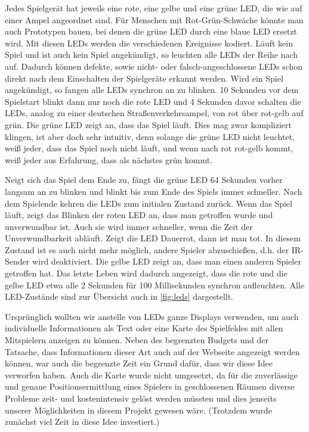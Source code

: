 Jedes Spielgerät hat jeweils eine rote, eine gelbe und eine grüne LED, die wie auf einer Ampel
angeordnet sind.
Für Menschen mit Rot-Grün-Schwäche könnte man auch Prototypen bauen, bei denen die grüne LED durch
eine blaue LED ersetzt wird.
Mit diesen LEDs werden die verschiedenen Ereignisse kodiert.
Läuft kein Spiel und ist auch kein Spiel angekündigt, so leuchten alle LEDs der Reihe nach auf.
Dadurch können defekte, sowie nicht- oder falsch-angeschlossene LEDs schon direkt nach dem
Einschalten der Spielgeräte erkannt werden.
Wird ein Spiel angekündigt, so fangen alle LEDs synchron an zu blinken.
10 Sekunden vor dem Spielstart blinkt dann nur noch die rote LED und 4 Sekunden davor schalten die
LEDs, analog zu einer deutschen Straßenverkehrsampel, von rot über rot-gelb auf grün.
Die grüne LED zeigt an, dass das Spiel läuft.
Dies mag zwar kompliziert klingen, ist aber doch sehr intuitiv, denn solange die grüne LED nicht
leuchtet, weiß jeder, dass das Spiel noch nicht läuft, und wenn nach rot rot-gelb kommt, weiß jeder
aus Erfahrung, dass als nächstes grün kommt.

Neigt sich das Spiel dem Ende zu, fängt die grüne LED 64 Sekunden vorher langsam an zu blinken und
blinkt bis zum Ende des Spiels immer schneller.
Nach dem Spielende kehren die LEDs zum initialen Zustand zurück.
Wenn das Spiel läuft, zeigt das Blinken der roten LED an, dass man getroffen wurde und unverwundbar
ist.
Auch sie wird immer schneller, wenn die Zeit der Unverwundbarkeit abläuft.
Zeigt die LED Dauerrot, dann ist man tot.
In diesem Zustand ist es auch nicht mehr möglich, andere Spieler abzuschießen, d.h. der IR-Sender
wird deaktiviert.
Die gelbe LED zeigt an, dass man einen anderen Spieler getroffen hat.
Das letzte Leben wird dadurch angezeigt, dass die rote und die gelbe LED etwa alle 2 Sekunden für
100 Millisekunden synchron aufleuchten.
Alle LED-Zustände sind zur Übersicht auch in \cref{fig:leds} dargestellt.

Ursprünglich wollten wir anstelle von LEDs ganze Displays verwenden, um auch individuelle
Informationen als Text oder eine Karte des Spielfeldes mit allen Mitspielern anzeigen zu können.
Neben des begrenzten Budgets und der Tatsache, dass Informationen dieser Art auch auf der Webseite
angezeigt werden können, war auch die begrenzte Zeit ein Grund dafür, dass wir diese Idee verworfen
haben.
Auch die Karte wurde nicht umgesetzt, da für die zuverlässige und genaue Positionsermittlung eines
Spielers in geschlossenen Räumen diverse Probleme zeit- und kostenintensiv gelöst werden müssten und
dies jenseits unserer Möglichkeiten in diesem Projekt gewesen wäre.
(Trotzdem wurde zunächst viel Zeit in diese Idee investiert.)

